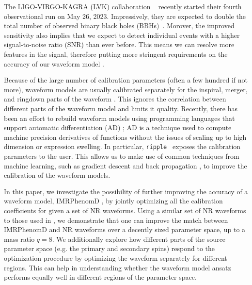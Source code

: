 \documentclass[twocolumn]{aastex631}
\newcommand{\ripple}{\texttt{ripple}}
\begin{document}

The LIGO-VIRGO-KAGRA (LVK) collaboration
~\citep{LIGOScientific:2014pky,LIGOScientific:2021usb,LIGOScientific:2021djp,
VIRGO:2014yos,KAGRA:2020tym} recently started their fourth observational
run on May 26, 2023. Impressively, they are
expected to double the total number of observed binary black holes (BBHs)~\citep{abbott2020prospects}.
Morover, the improved sensitivity also implies that we expect to
detect individual events with a higher signal-to-noise ratio (SNR) than ever before. This means
we can resolve more features in the signal, therefore putting more
stringent requirements on the accuracy of our waveform model \citep{purrer2020gravitational, hu2022assessing}.


Because of the large number of calibration parameters (often a few hundred if not
more), waveform models are usually calibrated separately for the inspiral, merger,
and ringdown parts of the waveform \citep{khan2016frequency, 
santamaria2010matching, pratten2021computationally}. This
ignores the correlation between different parts of the waveform model and limits
it quality. Recently, there has been an effort to rebuild waveform models
\citep{khan2016frequency} using programming languages that support automatic differentiation (AD) 
\citep{ripple, Iacovelli:2022bbs, Iacovelli:2022mbg, Coogan:2022qxs}; AD is a technique 
used to compute machine precision derivatives of functions 
without the issues of scaling up to high dimension or expression swelling. In
particular, \ripple~\citep{ripple} exposes the calibration parameters to the
user. This allows us to make use of common techniques from
machine learning, such as gradient descent and back propagation \citep{jax2018github, 
pytorch, tensorflow2015}, to improve the calibration of the waveform models.

In this paper, we investigate the possibility of further improving the accuracy
of a waveform model, IMRPhenomD \citep{khan2016frequency, husa2016frequency}, by jointly optimizing all the
calibration coefficients for given a set of NR waveforms. Using a similar set of NR
waveforms to those used in \citep{khan2016frequency, husa2016frequency},
we demonstrate that one can improve the match between IMRPhenomD and NR
waveforms over a decently sized parameter space, up to a mass ratio $q=8$. We additionally
explore how different parts of the source parameter space (e.g. the primary and
secondary spins) respond to the optimization procedure by optimizing the waveform
separately for different regions. This can help in understanding
whether the waveform model ansatz performs equally well in different regions of the
parameter space.
\end{document}
